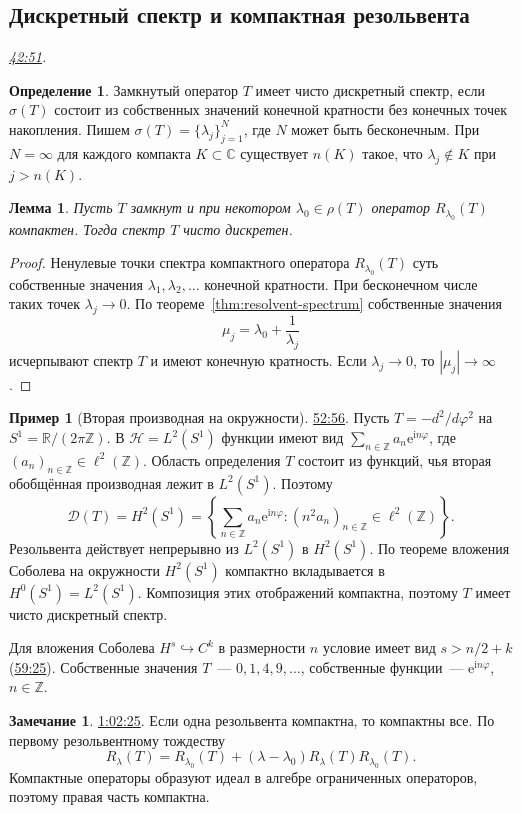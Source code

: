 \documentclass[11pt,a4paper]{article}
\theoremstyle{plain}
\newtheorem{lemma}[theorem]{Лемма}
\theoremstyle{definition}
\newtheorem{definition}[theorem]{Определение}
\newtheorem{example}[theorem]{Пример}
\newtheorem*{remark}{Замечание}
\newcommand{\CC}{\mathbb C}
\newcommand{\RR}{\mathbb R}
\newcommand{\ZZ}{\mathbb Z}
\newcommand{\Hh}{\mathcal H}
\newcommand{\Dom}{\mathcal D}
\newcommand{\ii}{\mathrm i}
\newcommand{\ee}{\mathrm e}
\newcommand{\at}[3]{\href{https://www.youtube.com/watch?v=#1&t=#2s}{#3}}
\newcommand{\topic}[2]{\Needspace{5\baselineskip}\subsection*{#1}\noindent\emph{#2.}\par\nobreak\smallskip}
\begin{document}
\topic{Дискретный спектр и компактная резольвента}{\at{pe5XWL9wtg4}{2571}{42:51}}
\begin{definition}
Замкнутый оператор $T$ имеет чисто дискретный спектр,
если $\sigma(T)$ состоит из собственных значений конечной
кратности без конечных точек накопления. Пишем
$\sigma(T)=\{\lambda_j\}_{j=1}^N$, где $N$ может быть
бесконечным. При $N=\infty$ для каждого компакта
$K\subset\CC$ существует $n(K)$ такое, что
$\lambda_j\notin K$ при $j>n(K)$.
\end{definition}
\begin{lemma}
Пусть $T$ замкнут и при некотором $\lambda_0\in\rho(T)$
оператор $R_{\lambda_0}(T)$ компактен. Тогда спектр
$T$ чисто дискретен.
\end{lemma}
\begin{proof}
Ненулевые точки спектра компактного оператора $R_{\lambda_0}(T)$
суть собственные значения $\lambda_1,\lambda_2,\ldots$ конечной
кратности. При бесконечном числе таких точек $\lambda_j\to0$.
По теореме~\ref{thm:resolvent-spectrum} собственные значения
\[
 \mu_j=\lambda_0+\frac1{\lambda_j}
\]
исчерпывают спектр $T$ и имеют конечную кратность.
Если $\lambda_j\to0$, то $|\mu_j|\to\infty$.
\end{proof}
\begin{example}[Вторая производная на окружности]
\at{pe5XWL9wtg4}{3176}{52:56}.
Пусть $T=-d^2/d\varphi^2$ на $S^1=\RR/(2\pi\ZZ)$.
В $\Hh=L^2(S^1)$ функции имеют вид
$\sum_{n\in\ZZ}a_n\ee^{\ii n\varphi}$, где
$(a_n)_{n\in\ZZ}\in\ell^2(\ZZ)$.
Область определения $T$ состоит из функций, чья вторая
обобщённая производная лежит в $L^2(S^1)$. Поэтому
\[
 \Dom(T)=H^2(S^1)=
 \left\{\sum_{n\in\ZZ}a_n\ee^{\ii n\varphi}:
            (n^2a_n)_{n\in\ZZ}\in\ell^2(\ZZ)\right\}.
\]
Резольвента действует непрерывно из $L^2(S^1)$ в $H^2(S^1)$.
По теореме вложения Соболева на окружности
$H^2(S^1)$ компактно вкладывается в $H^0(S^1)=L^2(S^1)$.
Композиция этих отображений компактна, поэтому $T$
имеет чисто дискретный спектр.

Для вложения Соболева $H^s\hookrightarrow C^k$ в размерности $n$
условие имеет вид $s>n/2+k$ (\at{pe5XWL9wtg4}{3565}{59:25}).
Собственные значения $T$~--- $0,1,4,9,\ldots$,
собственные функции~--- $\ee^{\ii n\varphi}$, $n\in\ZZ$.
\end{example}

\begin{remark}
\at{pe5XWL9wtg4}{3745}{1:02:25}.
Если одна резольвента компактна, то компактны все.
По первому резольвентному тождеству
\[
 R_\lambda(T)=R_{\lambda_0}(T)
 +(\lambda-\lambda_0)R_\lambda(T)R_{\lambda_0}(T).
\]
Компактные операторы образуют идеал в алгебре ограниченных
операторов, поэтому правая часть компактна.
\end{remark}
\end{document}
